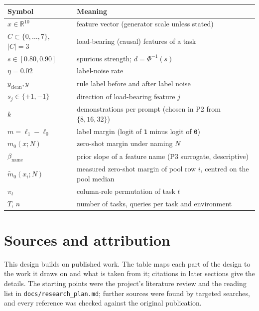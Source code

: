 \documentclass[11pt,a4paper]{article}
\newcommand{\RR}{\mathbb{R}}
\newcommand{\1}{\mathbf{1}}
\theoremstyle{plain}
\theoremstyle{definition}
\theoremstyle{remark}
\begin{document}
\begin{center}
\begin{tabular}{ll}
\toprule
\textbf{Symbol} & \textbf{Meaning} \\
\midrule
$x \in \RR^{10}$ & feature vector (generator scale unless stated) \\
$C \subset \{0,\ldots,7\}$, $|C|=3$ & load-bearing (causal) features of a task \\
$s \in [0.80, 0.90]$ & spurious strength; $d = \Phi^{-1}(s)$ \\
$\eta = 0.02$ & label-noise rate \\
$y_{\mathrm{clean}}, y$ & rule label before and after label noise \\
$s_j \in \{+1,-1\}$ & direction of load-bearing feature $j$ \\
$k$ & demonstrations per prompt (chosen in P2 from $\{8,16,32\}$) \\
$m = \ell_1 - \ell_0$ & label margin (logit of \texttt{1} minus logit of \texttt{0}) \\
$m_0(x; N)$ & zero-shot margin under naming $N$ \\
$\beta_{\mathrm{name}}$ & prior slope of a feature name (P3 surrogate, descriptive) \\
$\tilde m_0(x_i; N)$ & measured zero-shot margin of pool row $i$, centred on the pool median \\
$\pi_t$ & column-role permutation of task $t$ \\
$T$, $n$ & number of tasks, queries per task and environment \\
\bottomrule
\end{tabular}
\end{center}

\clearpage
\section{Sources and attribution}
\label{sec:attribution}

This design builds on published work. The table maps each part of the
design to the work it draws on and what is taken from it; citations in later
sections give the details. The starting points were the project's literature
review and the reading list in \texttt{docs/research\_plan.md}; further
sources were found by targeted searches, and every reference was checked
against the original publication.
\end{document}
